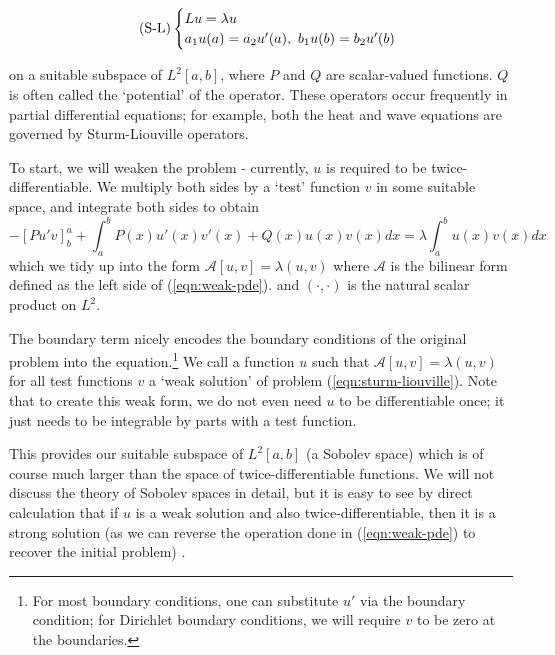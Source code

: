 \documentclass[../main.tex]{subfiles}
\begin{document}
\begin{equation*}\label{eqn:sturm-liouville}
\tag{S-L}
\begin{cases}
Lu = \lambda u$$ \\
a_1 u(a) = a_2 u'(a), \ b_1 u(b) = b_2 u'(b)
\end{cases}
\end{equation*}

on a suitable subspace of $L^2[a, b]$, where $P$ and $Q$ are scalar-valued
functions. $Q$ is often called the `potential' of the operator. These operators
occur frequently in partial differential equations; for example, both the heat
and wave equations are governed by Sturm-Liouville operators.

To start, we will weaken the problem - currently, $u$ is required to be
twice-differentiable. We multiply both sides by a `test' function $v$ in some
suitable space, and integrate both sides to obtain
\begin{equation}\label{eqn:weak-pde}
-[Pu'v]^a_b + \int_a^b P(x) u'(x) v'(x) + Q(x) u(x) v(x) dx = \lambda \int_a^b u(x) v(x) dx
\end{equation}
which we tidy up into the form 
$\mathcal{A}[u, v] = \lambda (u, v)$
where $\mathcal{A}$ is the bilinear form defined as the left side of
(\ref{eqn:weak-pde}). and $(\cdot, \cdot)$ is the natural scalar product on
$L^2$.

The boundary term nicely encodes the boundary conditions of the original
problem into the equation.\footnote{For most boundary conditions, one can
substitute $u'$ via the boundary condition; for Dirichlet boundary conditions,
we will require $v$ to be zero at the boundaries.} We call a function $u$ such
that $\mathcal{A}[u, v] = \lambda (u, v)$ for all test functions $v$ a `weak
solution' of problem (\ref{eqn:sturm-liouville}). Note that to create this weak
form, we do not even need $u$ to be differentiable once; it just needs to be
integrable by parts with a test function.

This provides our suitable subspace of $L^2[a, b]$ (a Sobolev space) which is of
course much larger than the space of twice-differentiable functions. We will not
discuss the theory of Sobolev spaces in detail, but it is easy to see by direct
calculation that if $u$ is a weak solution and also twice-differentiable, then
it is a strong solution (as we can reverse the operation done in
(\ref{eqn:weak-pde}) to recover the initial problem)
\cite{brezis2011functional}.
\end{document}
